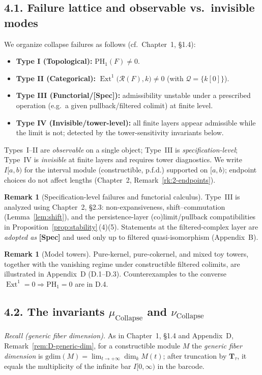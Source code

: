 \documentclass[11pt]{article}
\DeclareMathOperator{\Ext}{Ext}
\numberwithin{equation}{section}
\theoremstyle{definition}
\newtheorem{remark}[theorem]{Remark}
\begin{document}
\subsection*{4.1. Failure lattice and observable vs.\ invisible modes}
We organize collapse failures as follows (cf.\ Chapter~1, §1.4):

\begin{itemize}
  \item \textbf{Type I (Topological):} $\mathrm{PH}_1(F)\neq 0$.
  \item \textbf{Type II (Categorical):} $\Ext^1\!\big(\mathcal{R}(F),k\big)\neq 0$ (with $\mathcal{Q}=\{k[0]\}$).
  \item \textbf{Type III (Functorial/[Spec]):} admissibility unstable under a prescribed operation (e.g.\ a given pullback/filtered colimit) at finite level.
  \item \textbf{Type IV (Invisible/tower-level):} all finite layers appear admissible while the limit is not; detected by the tower-sensitivity invariants below.
\end{itemize}

Types~I–II are \emph{observable} on a single object; Type~III is \emph{specification-level}; Type~IV is \emph{invisible} at finite layers and requires tower diagnostics. We write $I[a,b)$ for the interval module (constructible, p.f.d.) supported on $[a,b)$; endpoint choices do not affect lengths (Chapter~2, Remark~\ref{rk:2-endpoints}).

\begin{remark}[Specification-level failures and functorial calculus]
Type~III is analyzed using Chapter~2, §2.3: non-expansiveness, shift–commutation (Lemma~\ref{lem:shift}), and the persistence-layer (co)limit/pullback compatibilities in Proposition~\ref{prop:stability}\,(4)(5). Statements at the filtered-complex layer are \emph{adopted as} \textbf{[Spec]} and used only up to filtered quasi-isomorphism (Appendix~B).
\end{remark}

\begin{remark}[Model towers]
Pure-kernel, pure-cokernel, and mixed toy towers, together with the vanishing regime under constructible filtered colimits, are illustrated in Appendix~D (D.1–D.3). Counterexamples to the converse $\Ext^1{=}0 \Rightarrow \mathrm{PH}_1{=}0$ are in D.4.
\end{remark}

\subsection*{4.2. The invariants \texorpdfstring{$\mu_{\mathrm{Collapse}}$}{mu\_Collapse} and \texorpdfstring{$\nu_{\mathrm{Collapse}}$}{nu\_Collapse}}
\emph{Recall (generic fiber dimension).} As in Chapter~1, §1.4 and Appendix~D, Remark~\ref{rem:D-generic-dim}, for a constructible module $M$ the \emph{generic fiber dimension} is $\mathrm{gdim}(M)=\lim_{t\to+\infty}\dim_k M(t)$; after truncation by $\mathbf{T}_\tau$, it equals the multiplicity of the infinite bar $I[0,\infty)$ in the barcode.
\end{document}
